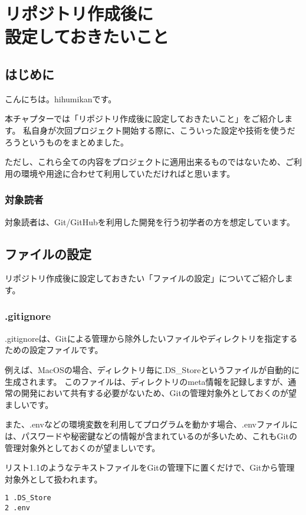 \chapter{リポジトリ作成後に\\設定しておきたいこと}
\section{はじめに}
こんにちは。hihumikanです。

本チャプターでは「リポジトリ作成後に設定しておきたいこと」をご紹介します。
私自身が次回プロジェクト開始する際に、こういった設定や技術を使うだろうというものをまとめました。

ただし、これら全ての内容をプロジェクトに適用出来るものではないため、ご利用の環境や用途に合わせて利用していただければと思います。

\subsection{対象読者}

対象読者は、Git/GitHubを利用した開発を行う初学者の方を想定しています。

\section{ファイルの設定}

リポジトリ作成後に設定しておきたい「ファイルの設定」についてご紹介します。

\subsection{.gitignore}

.gitignoreは、Gitによる管理から除外したいファイルやディレクトリを指定するための設定ファイルです。

例えば、MacOSの場合、ディレクトリ毎に.DS\_Storeというファイルが自動的に生成されます。
このファイルは、ディレクトリのmeta情報を記録しますが、通常の開発において共有する必要がないため、Gitの管理対象外としておくのが望ましいです。

また、.envなどの環境変数を利用してプログラムを動かす場合、.envファイルには、パスワードや秘密鍵などの情報が含まれているのが多いため、これもGitの管理対象外としておくのが望ましいです。

リスト1.1のようなテキストファイルをGitの管理下に置くだけで、Gitから管理対象外として扱われます。

\begin{tcolorbox}[title=リスト1.1 .gitignore]
  \begin{verbatim}
1 .DS_Store
2 .env
\end{verbatim}
\end{tcolorbox}


